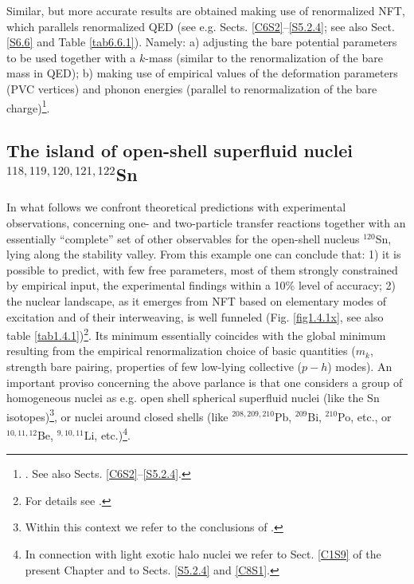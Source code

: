  Similar, but more accurate results are obtained  making use of renormalized NFT, which parallels renormalized QED (see e.g. Sects. \ref{C6S2}--\ref{S5.2.4}; see also Sect. \ref{S6.6} and Table \ref{tab6.6.1}). Namely: a) adjusting the bare potential parameters to be used together with a $k$-mass (similar to the renormalization of the bare mass in QED); b) making use of empirical values of the deformation parameters (PVC vertices) and phonon energies (parallel to renormalization of the bare charge)\footnote{\cite{Barranco:17,Barranco:20}. See also Sects. \ref{C6S2}--\ref{S5.2.4}.}.
\subsection{The island of open-shell superfluid nuclei $^{118,119,120,121,122}$Sn}\label{S2.4.1}
In what follows we confront theoretical predictions with experimental observations, concerning one- and two-particle transfer reactions together with an essentially ``complete'' set of other  observables  for the open-shell nucleus $^{120}$Sn, lying  along the stability valley. From this example one can conclude that: 1) it is possible to predict, with few free parameters, most of them strongly constrained by empirical input, the experimental findings within a 10\% level of accuracy; 2) the nuclear landscape, as it emerges from NFT based on elementary modes of excitation and of their interweaving, is well funneled (Fig. \ref{fig1.4.1x}, see also table \ref{tab1.4.1})\footnote{For details see \cite{Idini:15}.}. Its minimum essentially coincides with the global minimum resulting from the empirical renormalization choice of basic quantities ($m_k$, strength bare pairing, properties of few low-lying collective ($p-h$) modes). An important proviso concerning the above parlance is that one considers a group of homogeneous nuclei as e.g. open shell spherical superfluid nuclei (like the Sn isotopes)\footnote{Within this context we refer to the conclusions of \cite{Idini:15}.}, or nuclei around closed shells (like $^{208,209,210}$Pb, $^{209}$Bi, $^{210}$Po, etc., or $^{10,11,12}$Be, $^{9,10,11}$Li, etc.)\footnote{In connection with light exotic halo nuclei we refer to Sect. \ref{C1S9} of the present Chapter and to Sects. \ref{S5.2.4} and \ref{C8S1}.}. 

